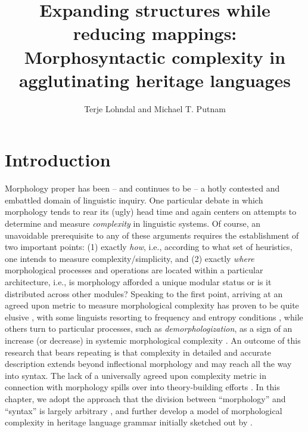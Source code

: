 \documentclass[output=paper,colorlinks,citecolor=brown,footheight=42pt]{langscibook}
\author{Terje Lohndal\affiliation{NTNU – Norwegian University of Science and Technology; UiT The Arctic University of Norway} and Michael T. Putnam\affiliation{Penn State University;University of Greenwich (CREL)}\orcid{}}
\title{Expanding structures while reducing mappings: Morphosyntactic complexity in agglutinating heritage languages}
\begin{document}
\maketitle

\section{Introduction}
Morphology proper has been -- and continues to be -- a hotly contested and embattled domain of linguistic inquiry. One particular debate in which morphology tends to rear its (ugly) head time and again centers on attempts to determine and measure \textit{complexity} in linguistic systems. Of course, an unavoidable prerequisite to any of these arguments requires the establishment of two important points:
(1) exactly \textit{how}, i.e., according to what set of heuristics, one intends to measure complexity/simplicity, and
(2) exactly \textit{where} morphological processes and operations are located within a particular architecture, i.e., is morphology afforded a unique modular status or is it distributed across other modules? Speaking to the first point, arriving at an agreed upon metric to measure morphological complexity has proven to be quite elusive \citep{arkadiev2020,stump2017,anderson2015}, with some linguists resorting to frequency and entropy conditions \citep{ackerman2013}, while others turn to particular processes, such as \textit{demorphologization}, as a sign of an increase (or decrease) in systemic morphological complexity \citep{mansfield2020,hopper1990}. An outcome of this research that bears repeating is that complexity in detailed and accurate description extends beyond inflectional morphology and may reach all the way into syntax. The lack of a universally agreed upon complexity metric in connection with morphology spills over into theory-building efforts \citep{mithun2020}. In this chapter, we adopt the approach that the division between “morphology” and “syntax” is largely arbitrary \citep{haspelmath2011}, and further develop a model of morphological complexity in heritage language grammar initially sketched out by \citet{lohnput21}.\largerpage
\end{document}
